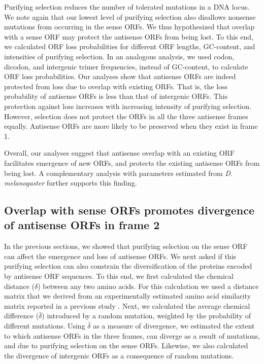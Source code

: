 \documentclass[12pt,a4paper]{article}
\begin{document}
Purifying selection reduces the number of tolerated mutations in a DNA locus. We note again that our lowest level of purifying selection also disallows nonsense mutations from occurring in the sense ORFs. We thus hypothesized that overlap with a sense ORF may protect the antisense ORFs from being lost. To this end, we calculated ORF loss probabilities for different ORF lengths, GC-content, and intensities of purifying selection. In an analogous analysis, we used codon, dicodon, and intergenic trimer frequencies, instead of GC-content, to calculate ORF loss probabilities. Our analyses show that antisense ORFs are indeed protected from loss due to overlap with existing ORFs. That is, the loss probability of antisense ORFs is less than that of intergenic ORFs. This protection against loss increases with increasing intensity of purifying selection. However, selection does not protect the ORFs in all the three antisense frames equally. Antisense ORFs are more likely to be preserved when they exist in frame 1. 

Overall, our analyses suggest that antisense overlap with an existing ORF facilitates emergence of new ORFs, and protects the existing antisense ORFs from being lost. A complementary analysis with parameters estimated from \textit{D. melanogaster} further supports this finding.

\subsection*{Overlap with sense ORFs promotes divergence of antisense ORFs in frame 2}

In the previous sections, we showed that purifying selection on the sense ORF can affect the emergence and loss of antisense ORFs. We next asked if this purifying selection can also constrain the diversification of the proteins encoded by antisense ORF sequences. To this end, we first calculated the chemical distance ($\delta$) between any two amino acids. For this calculation we used a distance matrix that we derived from an experimentally estimated amino acid similarity matrix reported in a previous study \citep{PMBEC}. Next, we calculated the average chemical difference ($\bar{\delta}$) introduced by a random mutation, weighted by the probability of different mutations. Using $\bar{\delta}$ as a measure of divergence, we estimated the extent to which antisense ORFs in the three frames, can diverge as a result of mutations, and due to purifying selection on the sense ORFs. Likewise, we also calculated the divergence of intergenic ORFs as a consequence of random mutations. 
\end{document}
